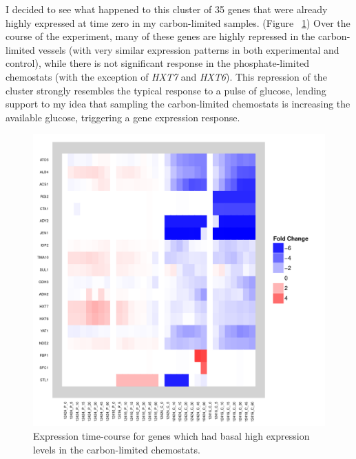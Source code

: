 \documentclass[letter]{article}\usepackage{graphicx, color}
\makeatletter
\def\maxwidth{ %
  \ifdim\Gin@nat@width>\linewidth
    \linewidth
  \else
    \Gin@nat@width
  \fi
}
\newenvironment{knitrout}{}{} %
\makeatother
\begin{document}
I decided to see what happened to this cluster of 35 genes that were already highly expressed at time zero in my carbon-limited samples. (Figure ~\ref{fig:carboncluster}) Over the course of the experiment, many of these genes are highly repressed in the carbon-limited vessels (with very similar expression patterns in both experimental and control), while there is not significant response in the phosphate-limited chemostats (with the exception of \emph{HXT7} and \emph{HXT6}). This repression of the cluster strongly resembles the typical response to a pulse of glucose, lending support to my idea that sampling the carbon-limited chemostats is increasing the available glucose, triggering a gene expression response.
\begin{figure}[here]
\centering
\begin{knitrout}
\color{fgcolor}\includegraphics[width=\maxwidth]{figure/p5} 
\end{knitrout}

\caption{Expression time-course for genes which had basal high expression levels in the carbon-limited chemostats.}
\label{fig:carboncluster}
\end{figure}
\end{document}
